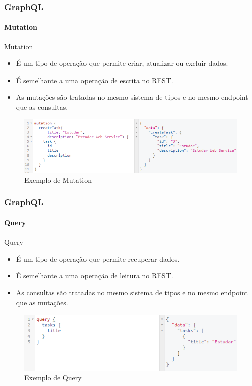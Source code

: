\documentclass[
	9pt, %
	t, %
]{beamer}
\newcommand{\yellowbox}[1]{\colorbox{yellow!75}{#1}}
\begin{document}
\begin{frame}
	\frametitle{GraphQL}
	\framesubtitle{Mutation}

	\begin{block}{Mutation}
		\begin{itemize}
			\item É um tipo de operação que permite \yellowbox{criar, atualizar ou excluir dados.}
			\item É semelhante a uma operação de escrita no REST.
			\item As mutações são tratadas no mesmo sistema de tipos e no mesmo endpoint que as
			      consultas.
		\end{itemize}
	\end{block}

	\begin{figure}
		\includegraphics[width=0.9\linewidth]{gql_mutation.png}
		\caption{Exemplo de Mutation}
		\label{fig:graphql_mutation}
	\end{figure}

\end{frame}

\begin{frame}
	\frametitle{GraphQL}
	\framesubtitle{Query}

	\begin{block}{Query}
		\begin{itemize}
			\item É um tipo de operação que permite \yellowbox{recuperar dados.}
			\item É semelhante a uma operação de leitura no REST.
			\item As consultas são tratadas no mesmo sistema de tipos e no mesmo endpoint que as
			      mutações.
		\end{itemize}
	\end{block}

	\begin{figure}
		\includegraphics[width=0.9\linewidth]{gql_query.png}
		\caption{Exemplo de Query}
		\label{fig:graphql_query}
	\end{figure}

\end{frame}
\end{document}
